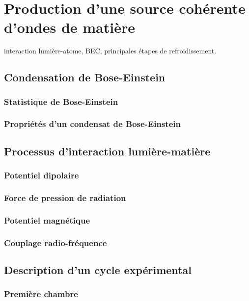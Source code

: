 \chapter{Production d'une source cohérente d'ondes de matière}
\label{ch:BECmanip}


interaction lumière-atome, BEC, principales étapes de refroidissement. 

\section{Condensation de Bose-Einstein}
\subsection{Statistique de Bose-Einstein}
\subsection{Propriétés d'un condensat de Bose-Einstein}

\section{Processus d'interaction lumière-matière} 
\subsection{Potentiel dipolaire}
\subsection{Force de pression de radiation}
\subsection{Potentiel magnétique}
\subsection{Couplage radio-fréquence} 

\section{Description d'un cycle expérimental}
\subsection{Première chambre}
